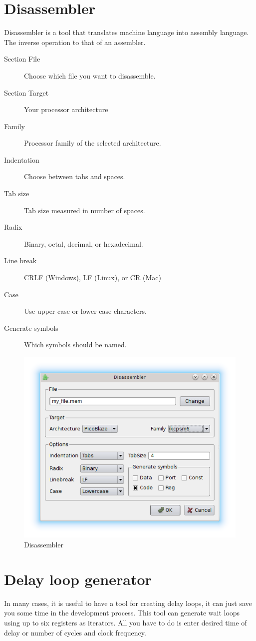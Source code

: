 \section{Disassembler}
    Disassembler is a tool that translates machine language into assembly language. The inverse
    operation to that of an assembler.

    \begin{description}
        \item[Section File] Choose which file you want to disassemble.
        \item[Section Target] Your processor architecture
        \item[Family] Processor family of the selected architecture.
        \item[Indentation] Choose between tabs and spaces.
        \item[Tab size] Tab size measured in number of spaces.
        \item[Radix] Binary, octal, decimal, or hexadecimal.
        \item[Line break] CRLF (Windows), LF (Linux), or CR (Mac)
        \item[Case] Use upper case or lower case characters.
        \item[Generate symbols] Which symbols should be named.
    \end{description}

    \begin{figure}[h]
        \centering{}
        \includegraphics[width=.5\textwidth]{img/disassembler_window.png}
        \caption{Disassembler}
    \end{figure}

\section{Delay loop generator}
    In many cases, it is useful to have a tool for creating delay loops, it can just save you some time in the
    development process. This tool can generate wait loops using up to six registers as iterators. All you have to do is
    enter desired time of delay or number of cycles and clock frequency.

